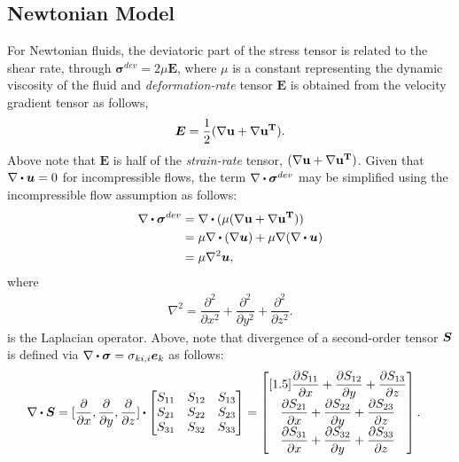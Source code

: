 \subsection{Newtonian Model}\label{sec:Newtonian}
For Newtonian fluids, the deviatoric part of the stress tensor is related to the shear rate, through $\bm{\sigma}^{dev} = 2 \mu \bm E$, where $\mu$ is a constant representing the dynamic viscosity of the fluid and \textit{deformation-rate} tensor $\bm E$ is obtained from the velocity gradient tensor as follows,
\begin{align}
\bm E=\frac{1}{2}(\nabla\bf{u}+\nabla\bf{u}^T).
\label{eq:def_rate}
\end{align}
Above note that $\bm E$ is half of the \textit{strain-rate} tensor, $(\nabla\bf{u}+\nabla\bf{u}^T)$. Given that $\nabla \bigcdot \vect{u}=0$ for incompressible flows, the term $\nabla  \bigcdot \bm \sigma^{dev}$  may be simplified using the incompressible flow assumption as follows:
\begin{align}
\nabla  \bigcdot \bm \sigma^{dev}&=\nabla \bigcdot (\mu (\nabla\bf{u}+\nabla\bf{u}^T)) \nonumber\\
& = \mu \nabla \bigcdot (\nabla \vect{u}) + \mu \nabla (\nabla \bigcdot  \vect{u})\nonumber\\
& = \mu \nabla^2 \vect{u}
\label{eq:div_grad_u},
\end{align}
where 
\begin{align}
\nabla^2 = \dfrac{\partial^2}{\partial x^2}+\dfrac{\partial^2}{\partial y^2}+\dfrac{\partial^2}{\partial z^2}.
\label{eq:laplacian_op}
\end{align}
is the Laplacian operator.
Above, note that  divergence of a second-order tensor $\boldsymbol{S}$ is defined via $\nabla \bigcdot \bm \sigma = \sigma_{ki,i}\vect{e}_k$ as follows: 
\begin{align}
&\nabla \bigcdot \bm{S}= [\frac{\partial }{\partial x}, \frac{\partial }{\partial y},\frac{\partial }{\partial z}] \bigcdot
\begin{bmatrix}
S_{11}& S_{12}& S_{13}\\
S_{21}& S_{22}& S_{23}\\
S_{31}& S_{32}& S_{33}\\
\end{bmatrix}=
\begin{bmatrix}[1.5]
\dfrac{\partial S_{11}}{\partial x}+ \dfrac{\partial S_{12}}{\partial y}+ \dfrac{\partial S_{13}}{\partial z}\\
\dfrac{\partial S_{21}}{\partial x}+ \dfrac{\partial S_{22}}{\partial y}+ \dfrac{\partial S_{23}}{\partial z}\\
\dfrac{\partial S_{31}}{\partial x}+ \dfrac{\partial S_{32}}{\partial y}+ \dfrac{\partial S_{33}}{\partial z}
\end{bmatrix}.
\label{eq:div_S}
\end{align}
